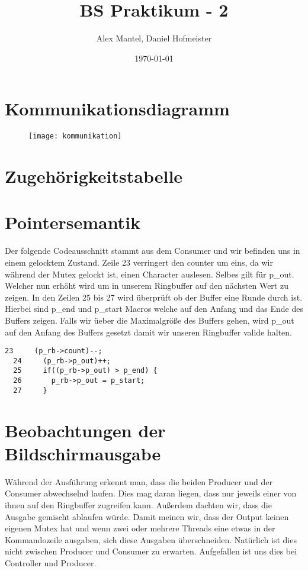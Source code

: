 \documentclass[pdftex,10pt,a4paper]{article}
\begin{document}
\title{BS Praktikum - 2}
\author{Alex Mantel, Daniel Hofmeister}
\date{\today}
\maketitle
\newpage

\tableofcontents
\newpage

\section{Kommunikationsdiagramm}

\begin{figure}[h]
  \texttt{[image: kommunikation]}
\end{figure}

\section{Zugeh\"origkeitstabelle}


\section{Pointersemantik}
Der folgende Codeausschnitt stammt aus dem Consumer und wir befinden uns in einem gelocktem Zustand. Zeile 23 verringert den counter um eins, da wir w\"ahrend der Mutex gelockt ist, einen Character auslesen. Selbes gilt f\"ur p\_out. Welcher nun erh\"oht wird um in unserem Ringbuffer auf den n\"achsten Wert zu zeigen. In den Zeilen 25 bis 27 wird \"uberpr\"uft ob der Buffer eine Runde durch ist. Hierbei sind p\_end und p\_start Macros welche auf den Anfang und das Ende des Buffers zeigen. Falls wir \"ueber die Maximalgr\"o{\ss}e des Buffers gehen, wird p\_out auf den Anfang des Buffers gesetzt damit wir unseren Ringbuffer valide halten.

\begin{lstlisting}[frame=single] 
  23     (p_rb->count)--;
  24     (p_rb->p_out)++;
  25     if((p_rb->p_out) > p_end) {
  26       p_rb->p_out = p_start;
  27     }
\end{lstlisting}

\section{Beobachtungen der Bildschirmausgabe}
W\"ahrend der Ausf\"uhrung erkennt man, dass die beiden Producer und der Consumer abwechselnd laufen. Dies mag daran liegen, dass nur jeweils einer von ihnen auf den Ringbuffer zugreifen kann. Au{\ss}erdem dachten wir, dass die Ausgabe gemischt ablaufen w\"urde. Damit meinen wir, dass der Output keinen eigenen Mutex hat und wenn zwei oder mehrere Threads eine etwas in der Kommandozeile ausgaben, sich diese Ausgaben \"uberschneiden. Nat\"urlich ist dies nicht zwischen Producer und Consumer zu erwarten. Aufgefallen ist uns dies bei Controller und Producer.
\end{document}
